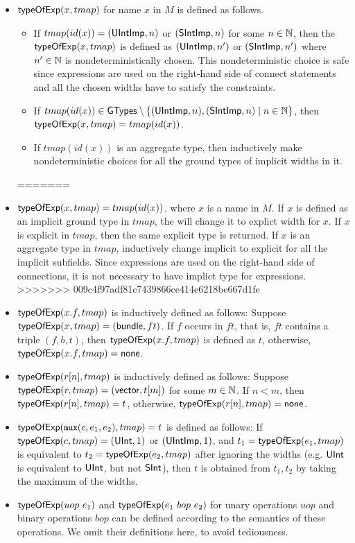 
\begin{itemize}
<<<<<<< HEAD
\item ${\sf typeOfExp}(x, tmap)$ for name $x$ in $M$ is defined as follows. 
\begin{itemize}
  \item If $tmap(id(x)) = ({\sf UIntImp}, n)$ or $({\sf SIntImp}, n)$ for some $n \in \mathbb{N}$, then the ${\sf typeOfExp}(x, tmap)$ is defined as $({\sf UIntImp}, n')$ or $({\sf SIntImp}, n')$ where $n' \in \mathbb{N}$ is nondeterministically chosen. This nondeterministic choice is safe since expressions are used on the right-hand side of connect statements and all the chosen widths have to satisfy the {\typecompatible} constraints. 
%
\item If $tmap(id(x)) \in {\sf GTypes} \setminus \{({\sf UIntImp}, n), ({\sf SIntImp}, n) \mid n \in \mathbb{N}\}$, then ${\sf typeOfExp}(x, tmap) = tmap(id(x))$.
%
\item If $tmap(id(x))$ is an aggregate type, then {\typeofexp} inductively make nondeterministic choices for all the ground types of implicit widths in it. 
\end{itemize}
=======
\item ${\sf typeOfExp}(x, tmap) =tmap(id(x))$, where $x$ is a name in $M$.
  If $x$ is defined as an implicit ground type in $tmap$, the {\typeofexp} will change it to explict width for $x$. If $x$ is explicit in $tmap$, then the same explicit type is returned. If $x$ is an aggregate type in $tmap$, {\typeofexp} inductively change implicit to explicit for all the implicit subfields. Since expressions are used on the right-hand side of connections, it is not necessary to have implict type for expressions.
>>>>>>> 009c4f97adf81c7439866ce414e6218be667d1fe
%
\item ${\sf typeOfExp}(x.f, tmap)$ 
  is inductively defined as follows: Suppose ${\sf typeOfExp}(x, tmap) = ({\sf bundle}, ft)$. If $f$ occurs in $ft$, that is, $ft$ contains a triple $(f, b, t)$, then ${\sf typeOfExp}(x.f, tmap)$ is defined as $t$, otherwise, ${\sf typeOfExp}(x.f, tmap) = {\sf none}$. 
%
\item ${\sf typeOfExp}(r[n], tmap)$ is inductively defined as follows: Suppose ${\sf typeOfExp}(r, tmap) = ({\sf vector}, t[m])$ for some $m \in \mathbb{N}$. If $n < m$, then ${\sf typeOfExp}(r[n], tmap) = t$, otherwise, ${\sf typeOfExp}(r[n], tmap) = {\sf none}$. 
%
\item $\typeofexp(\mbox{\prettyll{mux}}(c, e_1,e_2), tmap)= t$ is defined as follows: If ${\sf typeOfExp}(c, tmap)= ({\sf UInt}, 1)$ or $({\sf UIntImp}, 1)$, and $t_1 = {\sf typeOfExp}(e_1, tmap)$ is equivalent to $t_2 = {\sf typeOfExp}(e_2, tmap)$ after ignoring the widths (e.g. ${\sf UInt}$ is equivalent to ${\sf UInt}$, but not ${\sf SInt}$), then $t$ is obtained from $t_1, t_2$ by taking the maximum of the widths. 
%
\item ${\sf typeOfExp}(uop\ e_1)$ and ${\sf typeOfExp}(e_1 \ bop\ e_2)$ for unary operations $uop$ and binary operations $bop$ can be defined according to the semantics of these operations. We  omit their definitions here, to avoid tediousness.
\end{itemize}
